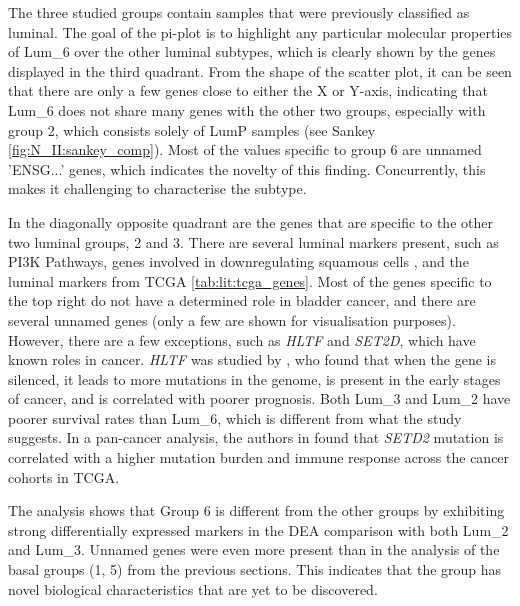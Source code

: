The three studied groups contain samples that were previously classified as luminal. The goal of the pi-plot is to highlight any particular molecular properties of Lum\_6 over the other luminal subtypes, which is clearly shown by the genes displayed in the third quadrant. From the shape of the scatter plot, it can be seen that there are only a few genes close to either the X or Y-axis, indicating that Lum\_6 does not share many genes with the other two groups, especially with group 2, which consists solely of LumP samples (see Sankey \cref{fig:N_II:sankey_comp}). Most of the values specific to group 6 are unnamed 'ENSG...' genes, which indicates the novelty of this finding. Concurrently, this makes it challenging to characterise the subtype.



In the diagonally opposite quadrant are the genes that are specific to the other two luminal groups, 2 and 3. There are several luminal markers present, such as PI3K Pathways, genes involved in downregulating squamous cells \citep{Hurst2022-sp}, and the luminal markers from TCGA \cref{tab:lit:tcga_genes}. Most of the genes specific to the top right do not have a determined role in bladder cancer, and there are several unnamed genes (only a few are shown for visualisation purposes). However, there are a few exceptions, such as \textit{HLTF} and \textit{SET2D}, which have known roles in cancer. \textit{HLTF} was studied by \citep{Dhont2016-vf}, who found that when the gene is silenced, it leads to more mutations in the genome, is present in the early stages of cancer, and is correlated with poorer prognosis. Both Lum\_3 and Lum\_2 have poorer survival rates than Lum\_6, which is different from what the study suggests. In a pan-cancer analysis, the authors in \citep{Lu2021-jt} found that \textit{SETD2} mutation is correlated with a higher mutation burden and immune response across the cancer cohorts in TCGA.

The analysis shows that Group 6 is different from the other groups by exhibiting strong differentially expressed markers in the DEA comparison with both Lum\_2 and Lum\_3. Unnamed genes were even more present than in the analysis of the basal groups (1, 5) from the previous sections. This indicates that the group has novel biological characteristics that are yet to be discovered.


